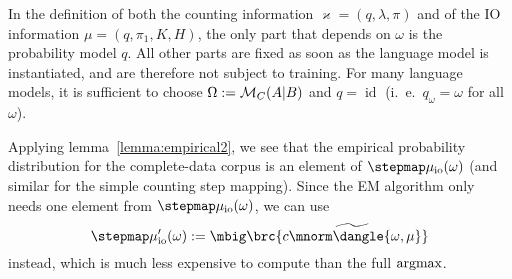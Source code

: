 In the definition of both the counting information $\varkappa=(q,\lambda,\pi)$
and of the IO information $\mu=(q,\pi_1,K,H)$, the only part that depends on
$\omega$ is the probability model $q$. All other parts are fixed as soon as the
language model is instantiated, and are therefore not subject to training. For
many language models, it is sufficient to choose $\Omega := \mathcal M_C(A|B)$ and $q
= \operatorname{id}$ (i.~e.~$q_\omega = \omega$ for all $\omega$).

Applying lemma~\ref{lemma:empirical2}, we see that the empirical probability
distribution for the complete-data corpus is an element of
$\stepmap\mu_\mathrm{io}(\omega)$ (and similar for the simple counting step
mapping). Since the EM algorithm only needs one element from
$\stepmap\mu_\mathrm{io}(\omega)$, we can use
\[
 \stepmap\mu'_\mathrm{io}(\omega) := \mbig\brc{ \widetilde{c\mnorm\dangle{\omega,\mu}} }
\]
instead, which is much less expensive to compute than the full $\argmax$.
